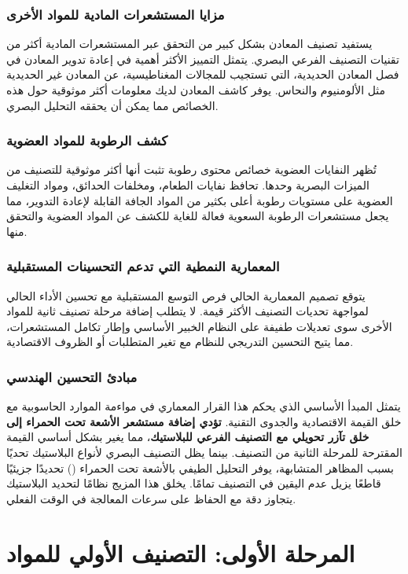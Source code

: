 \documentclass[11pt, a4paper]{article}
\begin{document}
\begin{RTL}
\subsubsection{مزايا المستشعرات المادية للمواد الأخرى}
يستفيد تصنيف المعادن بشكل كبير من التحقق عبر المستشعرات المادية أكثر من تقنيات التصنيف الفرعي البصري. يتمثل التمييز الأكثر أهمية في إعادة تدوير المعادن في فصل المعادن الحديدية، التي تستجيب للمجالات المغناطيسية، عن المعادن غير الحديدية مثل الألومنيوم والنحاس. يوفر كاشف المعادن لديك معلومات أكثر موثوقية حول هذه الخصائص مما يمكن أن يحققه التحليل البصري.

\subsubsection{كشف الرطوبة للمواد العضوية}
تُظهر النفايات العضوية خصائص محتوى رطوبة تثبت أنها أكثر موثوقية للتصنيف من الميزات البصرية وحدها. تحافظ نفايات الطعام، ومخلفات الحدائق، ومواد التغليف العضوية على مستويات رطوبة أعلى بكثير من المواد الجافة القابلة لإعادة التدوير، مما يجعل مستشعرات الرطوبة السعوية فعالة للغاية للكشف عن المواد العضوية والتحقق منها.

\subsubsection{المعمارية النمطية التي تدعم التحسينات المستقبلية}
يتوقع تصميم المعمارية الحالي فرص التوسع المستقبلية مع تحسين الأداء الحالي لمواجهة تحديات التصنيف الأكثر قيمة. لا يتطلب إضافة مرحلة تصنيف ثانية للمواد الأخرى سوى تعديلات طفيفة على النظام الخبير الأساسي وإطار تكامل المستشعرات، مما يتيح التحسين التدريجي للنظام مع تغير المتطلبات أو الظروف الاقتصادية.

\subsubsection{مبادئ التحسين الهندسي}
يتمثل المبدأ الأساسي الذي يحكم هذا القرار المعماري في مواءمة الموارد الحاسوبية مع خلق القيمة الاقتصادية والجدوى التقنية.
\textbf{تؤدي إضافة مستشعر الأشعة تحت الحمراء إلى خلق تآزر تحويلي مع التصنيف الفرعي للبلاستيك}، مما يغير بشكل أساسي القيمة المقترحة للمرحلة الثانية من التصنيف. بينما يظل التصنيف البصري لأنواع البلاستيك تحديًا بسبب المظاهر المتشابهة، يوفر التحليل الطيفي بالأشعة تحت الحمراء () تحديدًا جزيئيًا قاطعًا يزيل عدم اليقين في التصنيف تمامًا. يخلق هذا المزيج نظامًا لتحديد البلاستيك يتجاوز دقة  مع الحفاظ على سرعات المعالجة في الوقت الفعلي.

\section{المرحلة الأولى: التصنيف الأولي للمواد}

\end{RTL}
\end{document}

